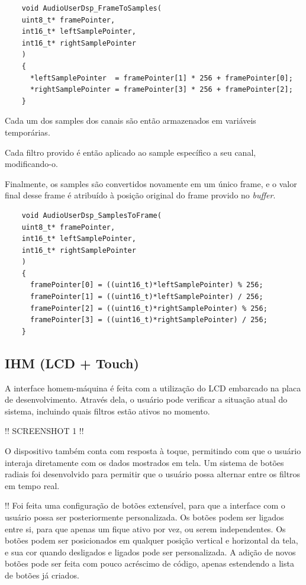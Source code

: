 \begin{verbatim}
    void AudioUserDsp_FrameToSamples(
    uint8_t* framePointer, 
    int16_t* leftSamplePointer, 
    int16_t* rightSamplePointer
    )
    {
      *leftSamplePointer  = framePointer[1] * 256 + framePointer[0];
      *rightSamplePointer = framePointer[3] * 256 + framePointer[2];
    }
\end{verbatim}

Cada um dos samples dos canais são então armazenados em variáveis temporárias. 

Cada filtro provido é então aplicado ao sample específico a seu canal, modificando-o. 

Finalmente, os samples são convertidos novamente em um único frame, e o valor final desse frame é atribuído à posição original do frame provido no \textit{buffer}.

\begin{verbatim}
    void AudioUserDsp_SamplesToFrame(
    uint8_t* framePointer, 
    int16_t* leftSamplePointer, 
    int16_t* rightSamplePointer
    )
    {
      framePointer[0] = ((uint16_t)*leftSamplePointer) % 256;
      framePointer[1] = ((uint16_t)*leftSamplePointer) / 256;
      framePointer[2] = ((uint16_t)*rightSamplePointer) % 256;
      framePointer[3] = ((uint16_t)*rightSamplePointer) / 256;
    }
\end{verbatim}


\subsection{IHM (LCD + Touch)}
A interface homem-máquina é feita com a utilização do LCD embarcado na placa de desenvolvimento. Através dela, o usuário pode verificar a situação atual do sistema, incluindo quais filtros estão ativos no momento.

!! SCREENSHOT 1 !!

O dispositivo também conta com resposta à toque, permitindo com que o usuário interaja diretamente com os dados mostrados em tela. Um sistema de botões radiais foi desenvolvido para permitir que o usuário possa alternar entre os filtros em tempo real.

!! Foi feita uma configuração de botões extensível, para que a interface com o usuário possa ser posteriormente personalizada. Os botões podem ser ligados entre si, para que apenas um fique ativo por vez, ou serem independentes. Os botões podem ser posicionados em qualquer posição vertical e horizontal da tela, e sua cor quando desligados e ligados pode ser personalizada.
A adição de novos botões pode ser feita com pouco acréscimo de código, apenas estendendo a lista de botões já criados.

